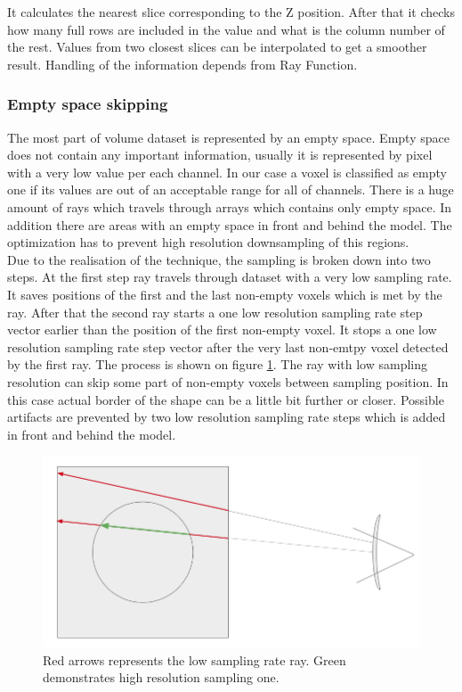 \documentclass[twoside, english, 11pt]{report}
\begin{document}
It calculates the nearest slice corresponding to the Z position. After that it checks how many full rows are included in the value and what is the column number of the rest. Values from two closest slices can be interpolated to get a smoother result. Handling of the information depends from Ray Function.\\

\subsubsection{Empty space skipping}

The most part of volume dataset is represented by an empty space. Empty space does not contain any important information, usually it is represented by pixel with a very low value per each channel. In our case a voxel is classified as empty one if its values are out of an acceptable range for all of channels. There is a huge amount of rays which travels through arrays which contains only empty space. In addition there are areas with an empty space in front and behind the model. The optimization has to prevent high resolution downsampling of this regions.\\

Due to the realisation of the technique, the sampling is broken down into two steps. At the first step ray travels through dataset with a very low sampling rate. It saves positions of the first and the last non-empty voxels which is met by the ray. After that the second ray starts a one low resolution sampling rate step vector earlier than the position of the first non-empty voxel. It stops a one low resolution sampling rate step vector after the very last non-emtpy voxel detected by the first ray. The process is shown on figure \ref{fig:empty}. The ray with low sampling resolution can skip some part of non-empty voxels between sampling position. In this case actual border of the shape can be a little bit further or closer.  Possible artifacts are prevented by two low resolution sampling rate steps which is added in front and behind the model.\\

\begin{figure}[!h]
\centerline{\includegraphics[scale = 0.5]{img/empty}}
\caption{Red arrows represents the low sampling rate ray. Green demonstrates high resolution sampling one.\label{fig:empty}}
\end{figure}
\end{document}
